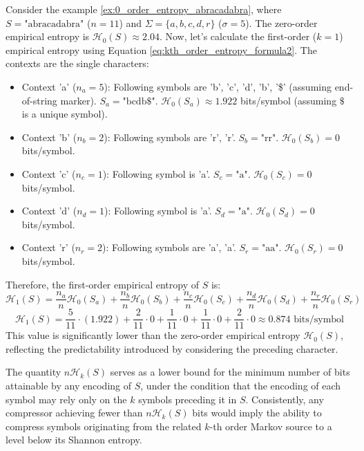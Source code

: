 \begin{example}
    Consider the example \ref{ex:0_order_entropy_abracadabra}, where $S = \text{"abracadabra"}$ ($n=11$) and $\Sigma = \{a, b, c, d, r\}$ ($\sigma=5$). The zero-order empirical entropy is $\mathcal{H}_0(S) \approx 2.04$. Now, let's calculate the first-order ($k=1$) empirical entropy using Equation \ref{eq:kth_order_entropy_formula2}. The contexts are the single characters:
    \begin{itemize}[noitemsep, topsep=0pt] %
        \item Context 'a' ($n_a=5$): Following symbols are 'b', 'c', 'd', 'b', '\$' (assuming end-of-string marker). $S_a = \text{"bcdb\$"}$. $\mathcal{H}_0(S_a) \approx 1.922$ bits/symbol (assuming $\$$ is a unique symbol).
        \item Context 'b' ($n_b=2$): Following symbols are 'r', 'r'. $S_b = \text{"rr"}$. $\mathcal{H}_0(S_b) = 0$ bits/symbol.
        \item Context 'c' ($n_c=1$): Following symbol is 'a'. $S_c = \text{"a"}$. $\mathcal{H}_0(S_c) = 0$ bits/symbol.
        \item Context 'd' ($n_d=1$): Following symbol is 'a'. $S_d = \text{"a"}$. $\mathcal{H}_0(S_d) = 0$ bits/symbol.
        \item Context 'r' ($n_r=2$): Following symbols are 'a', 'a'. $S_r = \text{"aa"}$. $\mathcal{H}_0(S_r) = 0$ bits/symbol.
    \end{itemize}
    Therefore, the first-order empirical entropy of $S$ is:
    \[
        \mathcal{H}_1(S) = \frac{n_a}{n}\mathcal{H}_0(S_a) + \frac{n_b}{n}\mathcal{H}_0(S_b) + \frac{n_c}{n}\mathcal{H}_0(S_c) + \frac{n_d}{n}\mathcal{H}_0(S_d) + \frac{n_r}{n}\mathcal{H}_0(S_r)
    \]
    \[
        \mathcal{H}_1(S) = \frac{5}{11} \cdot (1.922) + \frac{2}{11} \cdot 0 + \frac{1}{11} \cdot 0 + \frac{1}{11} \cdot 0 + \frac{2}{11} \cdot 0 \approx 0.874 \text{ bits/symbol}
    \]
    This value is significantly lower than the zero-order empirical entropy $\mathcal{H}_0(S)$, reflecting the predictability introduced by considering the preceding character.
\end{example}

\noindent The quantity $n \mathcal{H}_k(S)$ serves as a lower bound for the minimum number of bits attainable by any encoding of $S$, under the condition that the encoding of each symbol may rely only on the $k$ symbols preceding it in $S$. Consistently, any compressor achieving fewer than $n \mathcal{H}_k(S)$ bits would imply the ability to compress symbols originating from the related $k$-th order Markov source to a level below its Shannon entropy.

